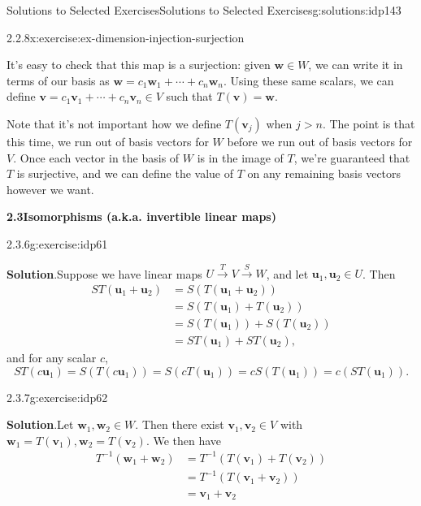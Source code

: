 \documentclass[oneside,10pt,]{book}
\newcommand{\blocktitlefont}{\relax}
\numberwithin{equation}{section}
\newcommand{\uu}{\mathbf{u}}
\newcommand{\vv}{\mathbf{v}}
\newcommand{\ww}{\mathbf{w}}
\newcommand{\amp}{&}
\begin{document}
\begin{solutions-chapter}{Solutions to Selected Exercises}{}{Solutions to Selected Exercises}{}{}{g:solutions:idp143}
\begin{inlinesolution}{2.2.8}{}{x:exercise:ex-dimension-injection-surjection}
\begin{enumerate}
\begin{equation*}
\end{equation*}
It's easy to check that this map is a surjection: given \(\ww\in W\), we can write it in terms of our basis as \(\ww=c_1\ww_1+\cdots + c_n\ww_n\). Using these same scalars, we can define \(\vv=c_1\vv_1+\cdots + c_n\vv_n\in V\) such that \(T(\vv)=\ww\).%
\par
Note that it's not important how we define \(T(\vv_j)\) when \(j>n\). The point is that this time, we run out of basis vectors for \(W\) before we run out of basis vectors for \(V\). Once each vector in the basis of \(W\) is in the image of \(T\), we're guaranteed that \(T\) is surjective, and we can define the value of \(T\) on any remaining basis vectors however we want.%
\end{enumerate}
%
\end{inlinesolution}%
\par\medskip
\noindent\textbf{\Large{}2.3\space\textperiodcentered\space{}Isomorphisms (a.k.a. invertible linear maps)}
\begin{inlinesolution}{2.3.6}{}{g:exercise:idp61}%
\par\smallskip%
\noindent\textbf{\blocktitlefont Solution}.\hypertarget{g:solution:idp162-back}{}\quad{}Suppose we have linear maps \(U\xrightarrow{T} V\xrightarrow{S} W\), and let \(\uu_1,\uu_2\in U\). Then%
\begin{align*}
ST(\uu_1+\uu_2) \amp = S(T(\uu_1+\uu_2)) \\
\amp = S(T(\uu_1)+T(\uu_2))\\
\amp = S(T(\uu_1))+S(T(\uu_2)) \\
\amp = ST(\uu_1)+ST(\uu_2)\text{,}
\end{align*}
and for any scalar \(c\),%
\begin{equation*}
ST(c\uu_1) = S(T(c\uu_1))=S(cT(\uu_1)) = cS(T(\uu_1))=c(ST(\uu_1))\text{.}
\end{equation*}
%
\end{inlinesolution}%
\begin{inlinesolution}{2.3.7}{}{g:exercise:idp62}%
\par\smallskip%
\noindent\textbf{\blocktitlefont Solution}.\hypertarget{g:solution:idp163-back}{}\quad{}Let \(\ww_1,\ww_2\in W\). Then there exist \(\vv_1,\vv_2\in V\)  with \(\ww_1=T(\vv_1), \ww_2=T(\vv_2)\). We then have%
\begin{align*}
T^{-1}(\ww_1+\ww_2) \amp = T^{-1}(T(\vv_1)+T(\vv_2)) \\
\amp = T^{-1}(T(\vv_1+\vv_2))\\
\amp = \vv_1+\vv_2\\

\end{align*}
\end{inlinesolution}
\end{solutions-chapter}
\end{document}
